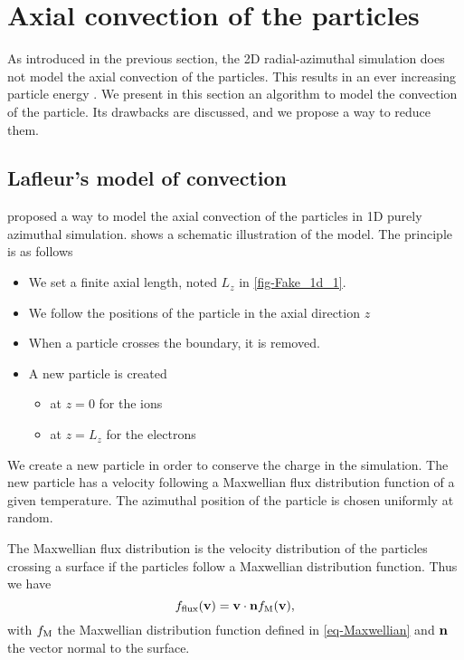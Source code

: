 
\section{Axial convection of the particles}
  \label{sec-reinjectionnoise}

  As introduced in the previous section, the \ac{2D} radial-azimuthal simulation does not model the axial convection of the particles.
  This results in an ever increasing particle energy \citep{lafleur2016a,heron2013}.
  We present in this section an algorithm to model the convection of the particle.
  Its drawbacks are discussed, and we propose a way to reduce them.
  
  \subsection{Lafleur's model of convection}

    \citet{lafleur2016a} proposed a way to model the axial convection of the particles in \ac{1D} purely azimuthal simulation.
     shows a schematic illustration of the model.
    The principle is as follows
    \begin{itemize}
      \item We set a finite axial length, noted $L_z$ in \cref{fig-Fake_1d_1}.
      \item We follow the positions of the particle in the axial direction $z$
      \item When a particle crosses the boundary, it is removed.
      \item A new particle is created
      \begin{itemize}
        \item at $z=0$ for the ions
        \item  at $z=L_z$ for the electrons
      \end{itemize}
    \end{itemize}

    We create a new particle in order to conserve the charge in the simulation.
    The new particle has a velocity following a Maxwellian flux distribution function of a given temperature.
    The azimuthal position of the particle is chosen uniformly at random.

    The Maxwellian flux distribution is the velocity distribution of the particles crossing a surface if the particles follow a Maxwellian distribution function. Thus we have
    \begin{equation} \label{eq-Maxwflux} 
      f_{\rm flux}({\mathbf v}) = {\mathbf v} \cdot {\mathbf n} f_{\rm M}({\mathbf v}),
    \end{equation}
    with $f_{\rm M}$ the Maxwellian distribution function defined in \cref{eq-Maxwellian} and ${\mathbf n}$ the vector normal to the surface.

